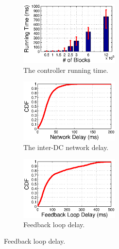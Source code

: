 \begin{figure}[t]
        \centering
        \begin{subfigure}[b]{0.3\textwidth}
                \centering
                \includegraphics[width=50mm]{images/CPUvsBlk_v3.eps}%
                \caption{The controller running time.}
                \label{fig:scale:cpu}
        \end{subfigure}
        \begin{subfigure}[b]{0.3\textwidth}
                \centering
                \includegraphics[width=50mm]{images/NetworkDelay.eps}%
                \caption{The inter-DC network delay.}
                \label{fig:scale:network}
        \end{subfigure}
        \begin{subfigure}[b]{0.3\textwidth}
                \centering
                \includegraphics[width=50mm]{images/CDFofFeedbackLoopDelay.eps}
                \caption{Feedback loop delay.}
                \label{fig:scale:feedback}
        \end{subfigure}
        \label{fig:scale}
\vspace{-0.4cm}
\end{figure}

